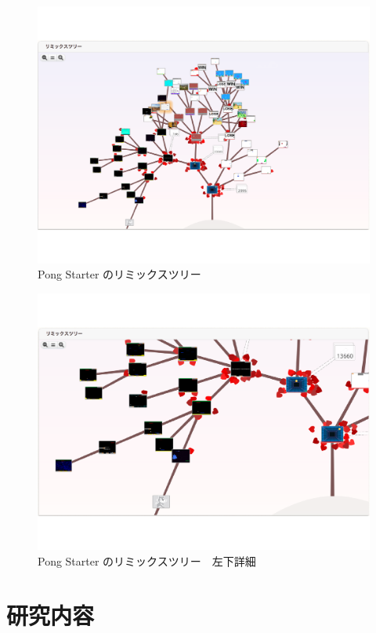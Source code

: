 \documentclass[a4paper,10pt,onecolumn,oneside,openany]{jsbook}
\begin{document}
\begin{figure}[ht]
  \centering
    \includegraphics[scale=0.5]{graphic/remixtree_all.pdf}
  \caption{Pong Starter のリミックスツリー}
  \label{psrt}
 \end{figure}

\begin{figure}[hb]
  \centering
    \includegraphics[scale=0.5]{graphic/remixtree_detail.pdf}
  \caption{Pong Starter のリミックスツリー　左下詳細}
  \label{rtdit}
 \end{figure}

 

\chapter{研究内容}
\end{document}
